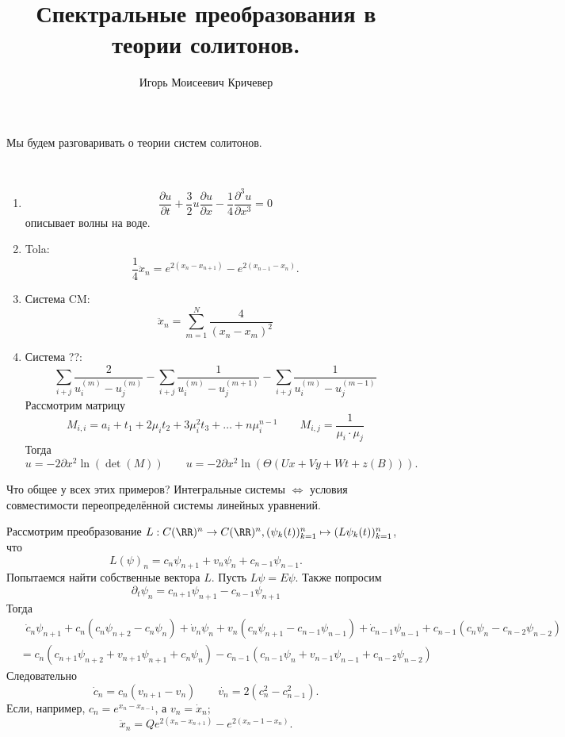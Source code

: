 \documentclass[12pt,a4paper]{article}
\title{Спектральные преобразования в теории солитонов.}
\author{Игорь Моисеевич Кричевер}
\begin{document}
    \maketitle

    Мы будем разговаривать о теории систем солитонов.

    \begin{example}\ 
        \begin{enumerate}
            \item \[\frac{\partial u}{\partial t} + \frac{3}{2} u \frac{\partial u}{\partial x} - \frac{1}{4} \frac{\partial^3 u}{\partial x^3} = 0\]
                описывает волны на воде.
            \item Tola: \[\frac{1}{4} \ddot{x}_n = e^{2(x_n - x_{n+1})} - e^{2(x_{n-1} - x_n)}.\]
            \item Система CM: \[\ddot{x}_n = \sum_{m=1}^N \frac{4}{(x_n - x_m)^2}\]
            \item Система ??: \[\sum_{i+j} \frac{2}{u_i^{(m)} - u_j^{(m)}} - \sum_{i+j} \frac{1}{u_i^{(m)} - u_j^{(m+1)}} - \sum_{i+j} \frac{1}{u_i^{(m)} - u_j^{(m-1)}}\]
                Рассмотрим матрицу
                \[
                    M_{i, i} = a_i + t_1 + 2 \mu_i t_2 + 3 \mu_i^2 t_3 + \dots + n \mu_i^{n-1}
                    \qquad
                    M_{i, j} = \frac{1}{\mu_i \cdot \mu_j}
                \]
                Тогда
                \[
                    u = -2 \partial x^2 \ln(\det(M))
                    \qquad
                    u = -2 \partial x^2 \ln(\Theta(Ux + Vy + Wt + z(B))).
                \]
        \end{enumerate}
    \end{example}

    Что общее у всех этих примеров? Интегральные системы $\Leftrightarrow$ условия совместимости переопределённой системы линейных уравнений.

    \begin{example}
        Рассмотрим преобразование $L: C(\RR)^n \to C(\RR)^n, (\psi_k(t))_{k=1}^n \mapsto (L \psi_k(t))_{k=1}^n$, что
        \[L(\psi)_n = c_n \psi_{n+1} + v_n \psi_n + c_{n-1} \psi_{n-1}.\]
        Попытаемся найти собственные вектора $L$. Пусть $L\psi = E \psi$. Также попросим
        \[\partial_t \psi_n = c_{n+1} \psi_{n+1} - c_{n-1} \psi_{n+1}\]
        Тогда
        \begin{align*}
            &\mathop{\phantom{=}} \dot{c}_n \psi_{n+1} + c_n (c_n \psi_{n+2} - c_n \psi_n) + \dot{v}_n \psi_n + v_n (c_n \psi_{n+1} - c_{n-1} \psi_{n-1}) + \dot{c}_{n-1} \psi_{n-1} + c_{n-1} (c_n \psi_n - c_{n-2} \psi_{n-2})\\
            &= c_n(c_{n+1} \psi_{n+2} + v_{n+1} \psi_{n+1} + c_n \psi_n) - c_{n-1} (c_{n-1} \psi_n + v_{n-1} \psi_{n-1} + c_{n-2} \psi_{n-2})
        \end{align*}
        Следовательно
        \[
            \dot{c}_n = c_n (v_{n+1} - v_n)
            \qquad
            \dot{v_n} = 2 (c_n^2 - c_{n-1}^2).
        \]
        Если, например, $c_n = e^{x_n - x_{n-1}}$, а $v_n = \dot{x}_n$;
        \[\ddot{x}_n = Q e^{2(x_n - x_{n+1})} - e^{2(x_n-1 - x_n)}.\]
    \end{example}
\end{document}
